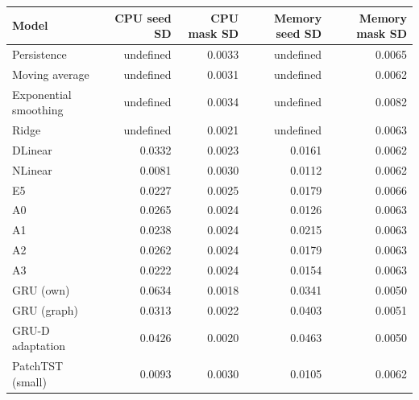 \begin{tabular}{lrrrr}
\toprule
Model & CPU seed SD & CPU mask SD & Memory seed SD & Memory mask SD \\
\midrule
Persistence & undefined & 0.0033 & undefined & 0.0065 \\
Moving average & undefined & 0.0031 & undefined & 0.0062 \\
Exponential smoothing & undefined & 0.0034 & undefined & 0.0082 \\
Ridge & undefined & 0.0021 & undefined & 0.0063 \\
DLinear & 0.0332 & 0.0023 & 0.0161 & 0.0062 \\
NLinear & 0.0081 & 0.0030 & 0.0112 & 0.0062 \\
E5 & 0.0227 & 0.0025 & 0.0179 & 0.0066 \\
A0 & 0.0265 & 0.0024 & 0.0126 & 0.0063 \\
A1 & 0.0238 & 0.0024 & 0.0215 & 0.0063 \\
A2 & 0.0262 & 0.0024 & 0.0179 & 0.0063 \\
A3 & 0.0222 & 0.0024 & 0.0154 & 0.0063 \\
GRU (own) & 0.0634 & 0.0018 & 0.0341 & 0.0050 \\
GRU (graph) & 0.0313 & 0.0022 & 0.0403 & 0.0051 \\
GRU-D adaptation & 0.0426 & 0.0020 & 0.0463 & 0.0050 \\
PatchTST (small) & 0.0093 & 0.0030 & 0.0105 & 0.0062 \\
\bottomrule
\end{tabular}
